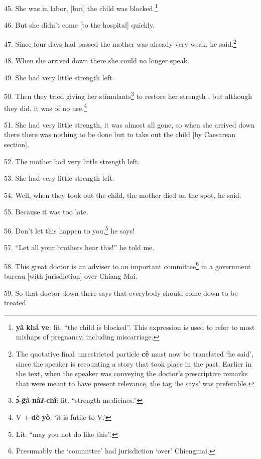 45. She was in labor, [but] the child was blocked.\footnote{\textbf{yâ} \textbf{khá} \textbf{ve}: lit. ``the child is blocked''. This expression is used to refer to most mishaps of pregnancy, including miscarriage.}

46. But she didn't come [to the hospital] quickly.

47. Since four days had passed the mother was already very weak, he said.\footnote{The quotative final unrestricted particle \textbf{cê} must now be translated `he said', since the speaker is recounting a story that took place in the past. Earlier in the text, when the speaker was conveying the doctor's prescriptive remarks that were meant to have present relevance, the tag `he says' was preferable.}

48. When she arrived down there she could no longer speak.

49. She had very little strength left.

50. Then they tried giving her stimulants\footnote{\textbf{ɔ̀-g̈â} \textbf{nâʔ-chî}: lit. ``strength-medicines.''} to restore her strength , but although
they did, it was of no use.\footnote{V + \textbf{dê} \textbf{yò}: `it is futile to V.'}

51. She had very little strength, it was almost all gone, so when she arrived down
there there was nothing to be done but to take out the child [by Caesarean section].

52. The mother had very little strength left.

53. She had very little strength left.

54. Well, when they took out the child, the mother died on the spot, he said.

55. Because it was too late.

56. Don't let this happen to you,\footnote{Lit. ``may you not do like this''.} he says!

57. ``Let all your brothers hear this!'' he told me.

58. This great doctor is an adviser to an important committee\footnote{Presumably the `committee' had jurisdiction `over' Chiengmai.} in a government
bureau [with jurisdiction] over Chiang Mai.

59. So that doctor down there says that everybody should come down to be treated.

